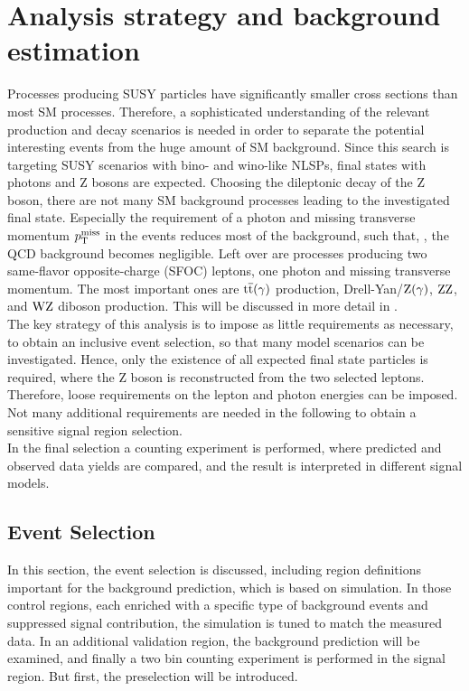 \chapter{Analysis strategy and background estimation}\label{chap:analysis}
\minitoc
Processes producing SUSY particles have significantly smaller cross sections than most SM processes. Therefore, a sophisticated understanding of the relevant production and decay scenarios is needed in order to separate the potential interesting events from the huge amount of SM background. Since this search is targeting SUSY scenarios with bino- and wino-like NLSPs, final states with photons and Z bosons are expected. Choosing the dileptonic decay of the Z boson, there are not many SM background processes leading to the investigated final state. Especially the requirement of a photon and missing transverse momentum $p_{\mathrm{T}}^\text{miss}$ in the events reduces most of the background, such that, \eg, the QCD background becomes negligible. Left over are processes producing two same-flavor opposite-charge (SFOC) leptons, one photon and missing transverse momentum. The most important ones are ${\mathrm{t}\overline{\mathrm{t}}}(\gamma)$ production, Drell-Yan/$\mathrm{Z}(\gamma)$, $\mathrm{Z}\mathrm{Z}$, and $\mathrm{W}\mathrm{Z}$ diboson production. This will be discussed in more detail in .\\
The key strategy of this analysis is to impose as little requirements as necessary, to obtain an inclusive event selection, so that many model scenarios can be investigated. Hence, only the existence of all expected final state particles is required, where the Z boson is reconstructed from the two selected leptons. Therefore, loose requirements on the lepton and photon energies can be imposed. Not many additional requirements are needed in the following to obtain a sensitive signal region selection.\\
In the final selection a counting experiment is performed, where predicted and observed data yields are compared, and the result is interpreted in different signal models.

\section{Event Selection}
In this section, the event selection is discussed, including region definitions important for the background prediction, which is based on simulation. In those control regions, each enriched with a specific type of background events and suppressed signal contribution, the simulation is tuned to match the measured data. In an additional validation region, the background prediction will be examined, and finally a two bin counting experiment is performed in the signal region. But first, the preselection will be introduced.
